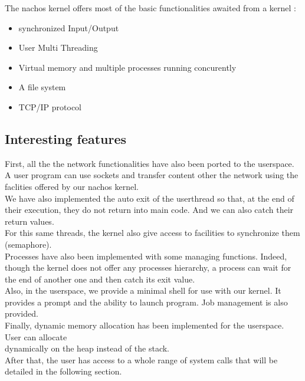 The nachos kernel offers most of the basic functionalities awaited from a kernel :\\
\begin{itemize}
\item synchronized Input/Output
\item User Multi Threading
\item Virtual memory and multiple processes running concurently
\item A file system
\item TCP/IP protocol
\end{itemize}

\subsection{Interesting features}

First, all the the network functionalities have also been ported to the userspace. A user program can use sockets and 
transfer content other the network using the faclities offered by our nachos kernel. \\
We have also implemented the auto exit of the userthread so that, at the end of their execution, they do not return
into main code. And we can also catch their return values.\\
For this same threads, the kernel also give access to facilities to synchronize them (semaphore).\\
Processes have also been implemented with some managing functions. Indeed, though the kernel does not offer any 
processes hierarchy, a process can wait for the end of another one and then catch its exit value.\\
Also, in the userspace, we provide a minimal shell for use with our kernel. It provides a prompt and the ability
to launch program. Job management is also provided.\\
Finally, dynamic memory allocation has been implemented for the userspace. User can allocate \\dynamically on the heap 
instead of the stack.\\
After that, the user has access to a whole range of system calls that will be detailed in the following section.
